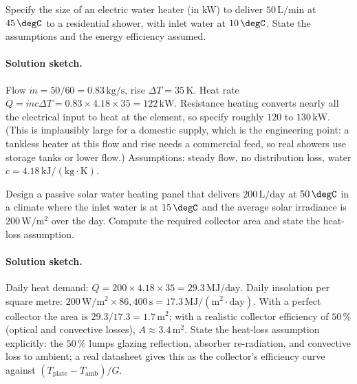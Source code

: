 \begin{exercise}
Specify the size of an electric water heater (in kW) to deliver
$50\,\text{L}/\text{min}$ at $45\,\degC$ to a residential shower,
with inlet water at $10\,\degC$. State the assumptions and the
energy efficiency assumed.
\paragraph{Solution sketch.} Flow $\dot{m} = 50/60 =
0.83\,\text{kg}/\text{s}$, rise $\Delta T = 35\,\si{\kelvin}$. Heat
rate $\dot{Q} = \dot{m}c\Delta T = 0.83 \times 4.18 \times 35 =
122\,\text{kW}$. Resistance heating converts nearly all the electrical
input to heat at the element, so specify roughly $120$ to
$130\,\text{kW}$. (This is
implausibly large for a domestic supply, which is the engineering
point: a tankless heater at this flow and rise needs a commercial feed,
so real showers use storage tanks or lower flow.) Assumptions: steady
flow, no distribution loss, water $c = 4.18\,\text{kJ}/(\text{kg}\cdot
\si{\kelvin})$.
\end{exercise}

\begin{exercise}
Design a passive solar water heating panel that delivers
$200\,\text{L}/\text{day}$ at $50\,\degC$ in a climate where the
inlet water is at $15\,\degC$ and the average solar irradiance is
$200\,\text{W}/\text{m}^2$ over the day. Compute the required
collector area and state the heat-loss assumption.
\paragraph{Solution sketch.} Daily heat demand:
$Q = 200 \times 4.18 \times 35 = 29.3\,\text{MJ}/\text{day}$. Daily
insolation per square metre: $200\,\text{W}/\text{m}^2 \times
86{,}400\,\text{s} = 17.3\,\text{MJ}/(\text{m}^2\cdot\text{day})$. With
a perfect collector the area is $29.3/17.3 = 1.7\,\text{m}^2$; with a
realistic collector efficiency of $50\,\%$ (optical and convective
losses), $A \approx 3.4\,\text{m}^2$. State the heat-loss assumption
explicitly: the $50\,\%$ lumps glazing reflection, absorber
re-radiation, and convective loss to ambient; a real datasheet gives
this as the collector's efficiency curve against $(T_{\text{plate}} -
T_{\text{amb}})/G$.
\end{exercise}

